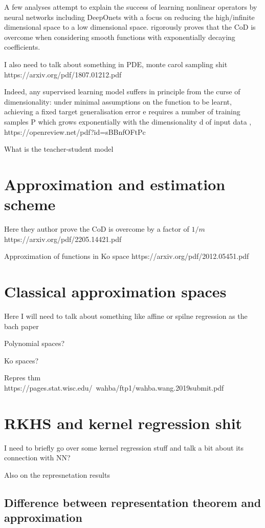 A few analyses attempt to explain the success of learning nonlinear operators by
neural networks including DeepOnets with a focus on reducing the high/infinite
dimensional space to a low dimensional space.
\cite{lanthalerErrorEstimatesDeepOnets2022} rigorously proves that the CoD is
overcome when considering smooth functions with exponentially decaying
coefficients.

I also need to talk about something in PDE, monte carol sampling shit https://arxiv.org/pdf/1807.01212.pdf

Indeed, any supervised learning model suffers in principle from the curse of
dimensionality: under minimal assumptions on the function to be learnt,
achieving a fixed target generalisation error e requires a number of training
samples P which grows exponentially with the dimensionality d of input data ,
 https://openreview.net/pdf?id=sBBnfOFtPc

What is the teacher-student model

\section{Approximation and estimation scheme}

Here they author prove the CoD is overcome by a factor of $1/m$
https://arxiv.org/pdf/2205.14421.pdf

Approximation of functions in Ko space https://arxiv.org/pdf/2012.05451.pdf

\section{Classical approximation spaces}

Here I will need to talk about something like affine or spilne regression as the
bach paper

Polynomial spaces?

Ko spaces?

Repres thm https://pages.stat.wisc.edu/~wahba/ftp1/wahba.wang.2019submit.pdf

\section{RKHS and kernel regression shit}

I need to briefly go over some kernel regression stuff and talk a bit about its
connection with NN?

Also on the represnetation results

\subsection{Difference between representation theorem and approximation}

